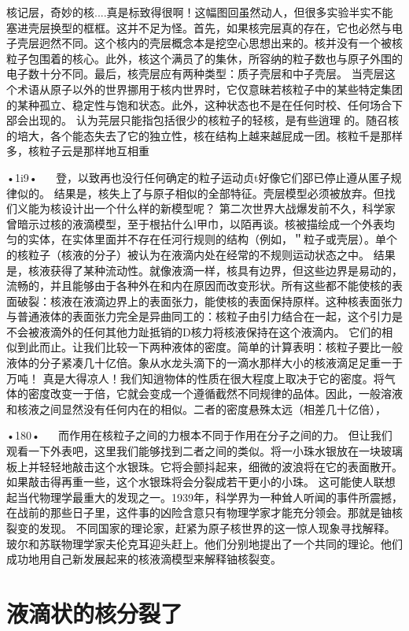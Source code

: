 核记层，奇妙的核....真是标致得很啊！这幅图回虽然动人，但很多实验半实不能塞进壳层换型的框框。这并不足为怪。首先，如果核完层真的存在，它也必然与电子壳层迥然不同。这个核内的壳层概念本是挖空心思想出来的。核并没有一个被核粒子包围着的核心。此外，核这个满员了的集休，所容纳的粒子数也与原子外围的电子数十分不同。最后，核壳层应有两种类型：质子壳层和中子壳层。
当壳层这个术语从原子以外的世界挪用于核内世界时，它仅意昧若核粒子中的某些特定集团的某种孤立、稳定性与饱和状态。此外，这种状态也不是在任何时校、任何场合下郘会出现的。
认为芫层只能指包括很少的核粒子的轻核，是有些逍理
的。随召核的培大，各个能态失去了它的独立性，核在结构上越来越屁成一团。核粒千是那样多，核粒子云是那样地互相重

•1i9•
  
登，以致再也没行任何确定的粒子运动贞t好像它们郘已停止遵从匿子规律似的。
结果是，核失上了与原子相似的全部特征。壳层模型必须被放弃。但找们义能为核设计出一个什么样的新模型呢？
第二次世界大战爆发前不久，科学家曾暗示过核的液滴模型，至于根拈什么l甲巾，以陌再谈。核被描绘成一个外表均匀的实体，在实体里面并不存在任河行规则的结构（例如，＂粒子或壳层）。单个的核粒子（核液的分子）被认为在液滴内处在经常的不规则运动状态之中。
结果是，核液获得了某种流动性。就像液滴一样，核具有边界，但这些边界是易动的，流畅的，并且能够由于各种外在和内在原因而改变形状。所有这些都不能使核的表面破裂：核液在液滴边界上的表面张力，能使核的表面保持原样。这种核表面张力与普通液体的表面张力完全是异曲同工的：核粒子由引力结合在一起，这个引力是不会被液滴外的任何其他力趾抵销的D核力将核液保持在这个液滴内。
它们的相似到此而止。让我们比较一下两种液体的密度。简单的计算表明：核粒子要比一般液体的分子紧凑几十亿倍。象从水龙头滴下的一滴水那样大小的核液滴足足重一于万吨！
真是大得凉人！我们知逍物体的性质在很大程度上取决于它的密度。将气体的密度改变一于倍，它就会变成一个遵循截然不同规律的品体。因此，一般溶液和核液之间显然没有任何内在的相似。二者的密度悬殊太远（相差几十亿倍），

•180•
  
而作用在核粒子之间的力根本不同于作用在分子之间的力。
但让我们观看一下外表吧，这里我们能够找到二者之间的类似。将一小珠水银放在一块玻璃板上并轻轻地敲击这个水银珠。它将会颤抖起来，细微的波浪将在它的表面散开。如果敲击得再重一些，这个水银珠将会分裂成若干更小的小珠。
这可能使人联想起当代物理学最重大的发现之一。1939年，科学界为一种耸人听闻的事件所震撼，在战前的那些日子里，这件事的凶险含意只有物理学家才能充分领会。那就是铀核裂变的发现。
不同国家的理论家，赶紧为原子核世界的这一惊人现象寻找解释。玻尔和苏联物理学家夫伦克耳迎头赶上。他们分别地提出了一个共同的理论。他们成功地用自己新发展起来的核液滴模型来解释铀核裂变。

\section{液滴状的核分裂了}

